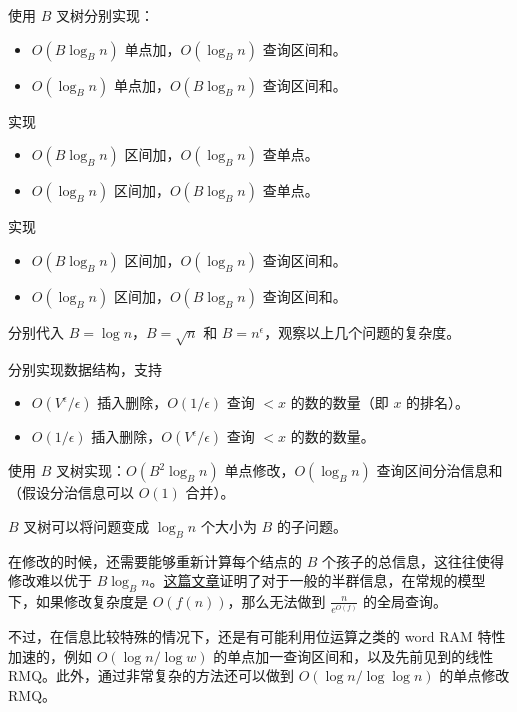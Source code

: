 \begin{example}
    使用 $B$ 叉树分别实现：
    \begin{itemize}
        \item $O(B\log_B n)$ 单点加，$O(\log_B n)$ 查询区间和。
        \item $O(\log_B n)$ 单点加，$O(B\log_B n)$ 查询区间和。
    \end{itemize}
\end{example}
\begin{exercise}[对偶]
    实现
    \begin{itemize}
        \item $O(B\log_B n)$ 区间加，$O(\log_B n)$ 查单点。
        \item $O(\log_B n)$ 区间加，$O(B\log_B n)$ 查单点。
    \end{itemize}
\end{exercise}
\begin{exercise}[差分]
    实现
    \begin{itemize}
        \item $O(B\log_B n)$ 区间加，$O(\log_B n)$ 查询区间和。
        \item $O(\log_B n)$ 区间加，$O(B\log_B n)$ 查询区间和。
    \end{itemize}
\end{exercise}
\begin{exercise}
    分别代入 $B=\log n$，$B=\sqrt{n}$ 和 $B=n^{\epsilon}$，观察以上几个问题的复杂度。
\end{exercise}
\begin{exercise}
    分别实现数据结构，支持
    \begin{itemize}
        \item $O(V^{\epsilon}/\epsilon)$ 插入删除，$O(1/\epsilon)$ 查询 $<x$ 的数的数量（即 $x$ 的排名）。
        \item $O(1/\epsilon)$ 插入删除，$O(V^{\epsilon}/\epsilon)$ 查询 $<x$ 的数的数量。
    \end{itemize}
\end{exercise}


\begin{example}
    使用 $B$ 叉树实现：$O(B^2\log_B n)$ 单点修改，$O(\log_B n)$ 查询区间分治信息和（假设分治信息可以 $O(1)$ 合并）。
    \begin{hint}
        $B$ 叉树可以将问题变成 $\log_B n$ 个大小为 $B$ 的子问题。
    \end{hint}
\end{example}
\begin{remark}
    在修改的时候，还需要能够重新计算每个结点的 $B$ 个孩子的总信息，这往往使得修改难以优于 $B\log_B n$。\href{https://www.cnblogs.com/-Houraisan-Kaguya/p/19601799}{这篇文章}证明了对于一般的半群信息，在常规的模型下，如果修改复杂度是 $O(f(n))$，那么无法做到 $\frac{n}{e^{O(f)}}$ 的全局查询。
    
    不过，在信息比较特殊的情况下，还是有可能利用位运算之类的 word RAM 特性加速的，例如 $O(\log n/\log w)$ 的单点加一查询区间和，以及先前见到的线性 RMQ。此外，通过非常复杂的方法还可以做到 $O(\log n/\log\log n)$ 的单点修改 RMQ。
\end{remark}

